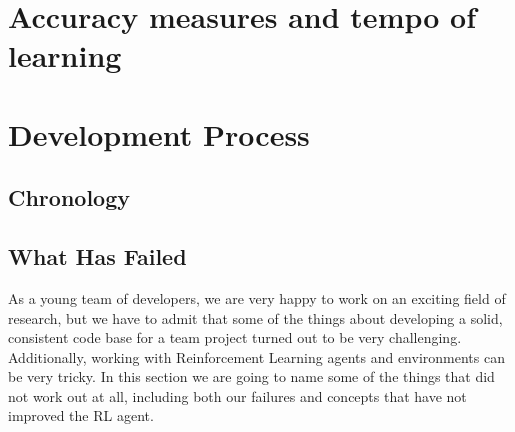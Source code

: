 \documentclass{article}
\begin{document}
\section{Accuracy measures and tempo of learning}

\section{Development Process}
\subsection{Chronology}
\subsection{What Has Failed}
As a young team of developers, we are very happy to work on an exciting field of research, but we have to admit that some of the things about developing a solid, consistent code base for a team project turned out to be very challenging. Additionally, working with Reinforcement Learning agents and environments can be very tricky. In this section we are going to name some of the things that did not work out at all, including both our failures and concepts that have not improved the RL agent. 
\end{document}
